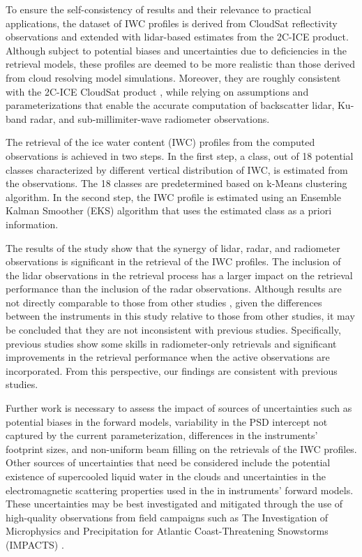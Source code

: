 \documentclass{ametsocV6.1}
\begin{document}
To ensure the self-consistency of results and their relevance to practical applications, the dataset of IWC 
profiles is derived from CloudSat reflectivity observations and extended with lidar-based estimates from the
2C-ICE product. Although subject to potential biases
and uncertainties due to deficiencies in the retrieval models, these profiles are deemed to be more realistic
than those derived from cloud resolving model simulations. Moreover, they are roughly consistent with
the 2C-ICE CloudSat product \citep{deng2015}, while relying on assumptions and parameterizations that
enable the accurate computation of backscatter lidar, Ku-band radar, and sub-millimiter-wave radiometer
observations.

The retrieval of the ice water content (IWC) profiles from the computed observations is achieved in two
steps.  In the first step, a class, out of 18 potential classes characterized by different 
vertical distribution of IWC, is estimated from the observations. The 18 classes are predetermined based on
k-Means clustering algorithm.  In the second step, the IWC profile is estimated using an Ensemble Kalman
Smoother (EKS) algorithm that uses the estimated class as a priori information.

The results of the study show that the synergy of lidar, radar, and radiometer observations is significant
in the retrieval of the IWC profiles.  The inclusion of the lidar observations in the retrieval process has a
larger impact on the retrieval performance than the inclusion of the radar observations.  Although results are
not directly comparable to those from other studies \citep{pfreundschuh2020synergistic,liu2022assessing}, given the differences
between the instruments in this study relative to those from other studies, it may be concluded that they
are not inconsistent with previous studies. Specifically, previous studies show some skills in radiometer-only
retrievals and significant improvements in the retrieval performance when the active observations are incorporated.
From this perspective, our findings are consistent with previous studies.

Further work is necessary to assess the impact of sources of uncertainties such as potential biases in the
forward models, variability in the
PSD intercept not captured by the current parameterization, differences in the instruments' footprint sizes,
and non-uniform beam filling on the retrievals of the IWC profiles.  Other sources of uncertainties that
need be considered include the potential existence of supercooled liquid water in the clouds and uncertainties
in the electromagnetic scattering properties used in the in instruments' forward models. These uncertainties
may be best investigated and mitigated through the use of high-quality observations from field campaigns
such as The Investigation of Microphysics and Precipitation for Atlantic Coast-Threatening Snowstorms (IMPACTS)
\citep{mcmurdie2022}.
\end{document}
